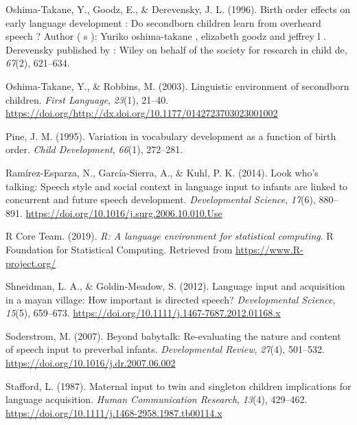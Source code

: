 \documentclass[
  english,
  man,floatsintext]{apa6}
\begin{document}
\leavevmode\hypertarget{ref-oshima-takane_birth_1996}{}%
Oshima-Takane, Y., Goodz, E., \& Derevensky, J. L. (1996). Birth order effects on early language development : Do secondborn children learn from overheard speech ? Author ( s ): Yuriko oshima-takane , elizabeth goodz and jeffrey l . Derevensky published by : Wiley on behalf of the society for research in child de, \emph{67}(2), 621--634.

\leavevmode\hypertarget{ref-oshima-takane_linguistic_2003}{}%
Oshima-Takane, Y., \& Robbins, M. (2003). Linguistic environment of secondborn children. \emph{First Language}, \emph{23}(1), 21--40. \url{https://doi.org/http://dx.doi.org/10.1177/0142723703023001002}

\leavevmode\hypertarget{ref-pine_variation_1995}{}%
Pine, J. M. (1995). Variation in vocabulary development as a function of birth order. \emph{Child Development}, \emph{66}(1), 272--281.

\leavevmode\hypertarget{ref-ramirez-esparza_look_2014}{}%
Ramírez-Esparza, N., García-Sierra, A., \& Kuhl, P. K. (2014). Look who's talking: Speech style and social context in language input to infants are linked to concurrent and future speech development. \emph{Developmental Science}, \emph{17}(6), 880--891. \url{https://doi.org/10.1016/j.surg.2006.10.010.Use}

\leavevmode\hypertarget{ref-r_core_team_r_2019}{}%
R Core Team. (2019). \emph{R: A language environment for statistical computing}. R Foundation for Statistical Computing. Retrieved from \url{https://www.R-project.org/}

\leavevmode\hypertarget{ref-shneidman_language_2012}{}%
Shneidman, L. A., \& Goldin‐Meadow, S. (2012). Language input and acquisition in a mayan village: How important is directed speech? \emph{Developmental Science}, \emph{15}(5), 659--673. \url{https://doi.org/10.1111/j.1467-7687.2012.01168.x}

\leavevmode\hypertarget{ref-soderstrom_beyond_2007}{}%
Soderstrom, M. (2007). Beyond babytalk: Re-evaluating the nature and content of speech input to preverbal infants. \emph{Developmental Review}, \emph{27}(4), 501--532. \url{https://doi.org/10.1016/j.dr.2007.06.002}

\leavevmode\hypertarget{ref-stafford_maternal_1987}{}%
Stafford, L. (1987). Maternal input to twin and singleton children implications for language acquisition. \emph{Human Communication Research}, \emph{13}(4), 429--462. \url{https://doi.org/10.1111/j.1468-2958.1987.tb00114.x}
\end{document}
